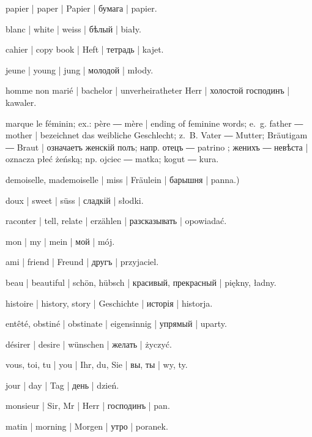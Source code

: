 \begin{ekzvocab}{1em}
 papier | paper | Papier | бумага | papier.

 blanc | white | weiss | бѣлый | biały.

 cahier | copy book | Heft | тетрадь | kajet.

 jeune | young | jung | молодой | młody.

 homme non marié | bachelor | unverheiratheter Herr | холостой господинъ | kawaler.

 marque le féminin; ex.:  père ―  mère | ending of feminine words; e.~g.  father ―  mother | bezeichnet das weibliche Geschlecht; z.~B.  Vater ―  Mutter;  Bräutigam ―  Braut | означаетъ женскій полъ; напр.  отецъ ― patrino ;  женихъ ―  невѣста | oznacza płeć żeńską; np.  ojciec ―  matka;  kogut ―  kura.

 demoiselle, mademoiselle | miss | Fräulein | барышня | panna.)

 doux | sweet | süss | сладкій | słodki.

 raconter | tell, relate | erzählen | разсказывать | opowiadać.

 mon | my | mein | мой | mój.

 ami | friend | Freund | другъ | przyjaciel.

 beau | beautiful | schön, hübsch | красивый, прекрасный | piękny, ładny.

 histoire | history, story | Geschichte | исторія | historja.

 entêté, obstiné | obstinate | eigensinnig | упрямый | uparty.

 désirer | desire | wünschen | желать | życzyć.

 vous, toi, tu | you | Ihr, du, Sie | вы, ты | wy, ty.

 jour | day | Tag | день | dzień.

 monsieur | Sir, Mr | Herr | господинъ | pan.

 matin | morning | Morgen | утро | poranek.


\end{ekzvocab}
